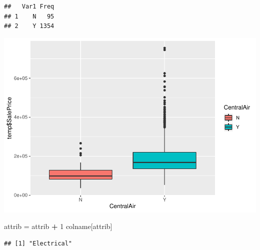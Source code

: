 \documentclass[]{article}
\newenvironment{Shaded}{\begin{snugshade}}{\end{snugshade}}
\newcommand{\DecValTok}[1]{\textcolor[rgb]{0.00,0.00,0.81}{#1}}
\newcommand{\StringTok}[1]{\textcolor[rgb]{0.31,0.60,0.02}{#1}}
\newcommand{\OperatorTok}[1]{\textcolor[rgb]{0.81,0.36,0.00}{\textbf{#1}}}
\newcommand{\NormalTok}[1]{#1}
\begin{document}
\begin{verbatim}
##   Var1 Freq
## 1    N   95
## 2    Y 1354
\end{verbatim}

\includegraphics{EDA_files/figure-latex/unnamed-chunk-64-1.pdf}

\begin{Shaded}
\begin{Highlighting}[]
\NormalTok{attrib =}\StringTok{ }\NormalTok{attrib }\OperatorTok{+}\StringTok{ }\DecValTok{1}
\NormalTok{colname[attrib]}
\end{Highlighting}
\end{Shaded}

\begin{verbatim}
## [1] "Electrical"
\end{verbatim}
\end{document}

